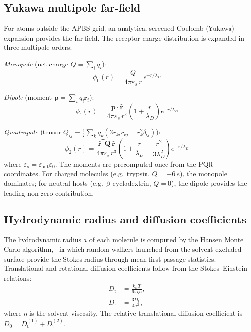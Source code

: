 \documentclass[journal=jctcce,manuscript=article,layout=twocolumn]{achemso}
\newcommand{\kBT}{k_{\mathrm{B}}T}
\newcommand{\Dt}{D_{\!\mathrm{t}}}
\newcommand{\Dr}{D_{\!\mathrm{r}}}
\newcommand{\rhat}{\hat{\mathbf{r}}}
\begin{document}
\subsection{Yukawa multipole far-field}

For atoms outside the APBS grid, an analytical screened Coulomb
(Yukawa) expansion provides the far-field.
The receptor charge distribution is expanded in three multipole
orders:

\textit{Monopole} (net charge $Q = \sum_i q_i$):
\begin{equation}
\phi_0(r) = \frac{Q}{4\pi\varepsilon_s\, r}\, e^{-r/\lambda_D}
\label{eq:yuk_mono}
\end{equation}

\textit{Dipole} (moment $\mathbf{p} = \sum_i q_i \mathbf{r}_i$):
\begin{equation}
\phi_1(r) = \frac{\mathbf{p}\cdot\rhat}
  {4\pi\varepsilon_s\, r^2}
  \left(1 + \frac{r}{\lambda_D}\right) e^{-r/\lambda_D}
\label{eq:yuk_dip}
\end{equation}

\textit{Quadrupole} (tensor $Q_{ij} = \frac{1}{2}\sum_k q_k(3r_{ki}r_{kj} - r_k^2\delta_{ij})$):
\begin{equation}
\phi_2(r) = \frac{\rhat^\mathsf{T}\mathbf{Q}\,\rhat}
  {4\pi\varepsilon_s\, r^3}
  \left(1 + \frac{r}{\lambda_D}
  + \frac{r^2}{3\lambda_D^2}\right) e^{-r/\lambda_D}
\label{eq:yuk_quad}
\end{equation}
where $\varepsilon_s = \varepsilon_\mathrm{out}\varepsilon_0$.
The moments are precomputed once from the PQR coordinates.
For charged molecules (e.g.\ trypsin, $Q = +6\,e$), the monopole
dominates; for neutral hosts (e.g.\ $\beta$-cyclodextrin, $Q = 0$),
the dipole provides the leading non-zero contribution.

\subsection{Hydrodynamic radius and diffusion coefficients}

The hydrodynamic radius $a$ of each molecule is computed by the
Hansen Monte Carlo algorithm,~\cite{Hansen2004} in which random
walkers launched from the solvent-excluded surface provide the
Stokes radius through mean first-passage statistics.
Translational and rotational diffusion coefficients follow from
the Stokes--Einstein relations:
\begin{align}
\Dt &= \frac{\kBT}{6\pi\eta a}, \label{eq:Dt}\\
\Dr &= \frac{3\Dt}{4a^2}, \label{eq:Dr}
\end{align}
where $\eta$ is the solvent viscosity.
The relative translational diffusion coefficient is
$D_0 = \Dt^{(1)} + \Dt^{(2)}$.
\end{document}
